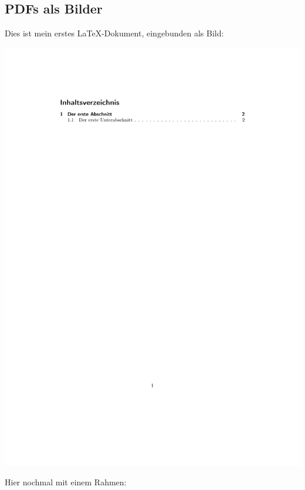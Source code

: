 \documentclass[a4paper, 10pt,onecolumn]{scrartcl}
\begin{document}
\subsection{PDFs als Bilder}
Dies ist mein erstes \LaTeX-Dokument, eingebunden als Bild:
\begin{center}
	\includegraphics[scale=0.25, page=2]{hellooworld.pdf}
\end{center}
Hier nochmal mit einem Rahmen:
\end{document}
